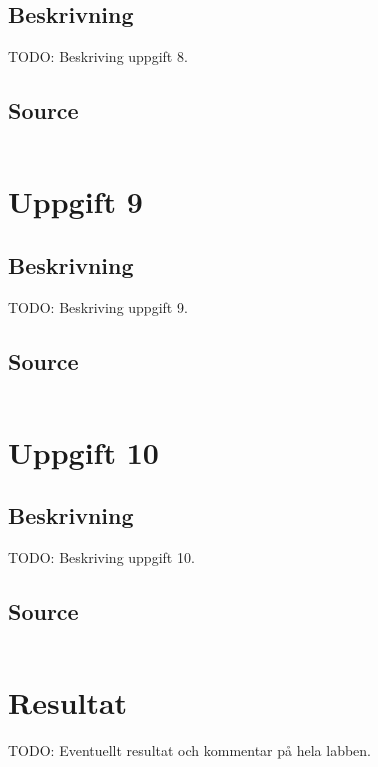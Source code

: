 \documentclass[11pt,a4paper]{article}
\begin{document}
\subsection{Beskrivning}
TODO: Beskriving uppgift 8.

\subsection{Source}\label{uppgift-8_src}
\inputminted[]{java}{../src/Lab1Uppg08.java}

\section{Uppgift 9}\label{uppgift-9}

\subsection{Beskrivning}
TODO: Beskriving uppgift 9.

\subsection{Source}\label{uppgift-9_src}
\inputminted[]{java}{../src/Lab1Uppg09.java}

\section{Uppgift 10}\label{uppgift-10}

\subsection{Beskrivning}
TODO: Beskriving uppgift 10.

\subsection{Source}\label{uppgift-10_src}
\inputminted[]{java}{../src/Lab1Uppg10.java}


\section{Resultat}\label{setup}
TODO: Eventuellt resultat och kommentar på hela labben.
\end{document}
